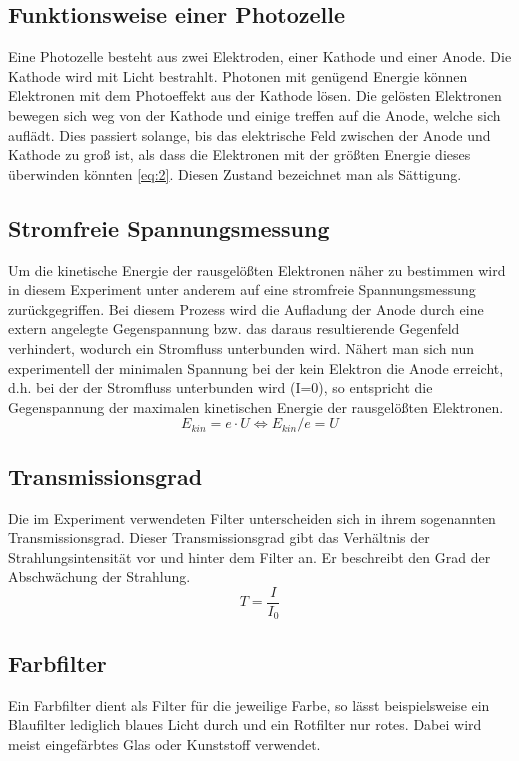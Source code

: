 \documentclass{scrartcl}
\begin{document}
	\subsection{Funktionsweise einer Photozelle}
	Eine Photozelle besteht aus zwei Elektroden, einer Kathode und einer Anode. Die Kathode wird mit Licht bestrahlt.
	 Photonen mit genügend Energie können Elektronen mit dem Photoeffekt aus der Kathode lösen.
	  Die gelösten Elektronen bewegen sich weg von der Kathode und einige treffen auf die Anode, welche sich
	   auflädt. Dies passiert solange, bis das elektrische Feld zwischen der Anode und Kathode zu groß ist,
		als dass die Elektronen mit der größten Energie dieses überwinden könnten \label{eq:2} \ref{eq:2}.
		 Diesen Zustand bezeichnet man als Sättigung.
	\subsection{Stromfreie Spannungsmessung}
		Um die kinetische Energie der rausgelößten Elektronen näher zu bestimmen wird in diesem Experiment unter anderem
		auf eine stromfreie Spannungsmessung zurückgegriffen. Bei diesem Prozess wird die Aufladung der Anode durch eine 
		extern angelegte Gegenspannung bzw. das daraus resultierende Gegenfeld verhindert, wodurch ein Stromfluss unterbunden wird.
		Nähert man sich nun experimentell der minimalen Spannung bei der kein Elektron die Anode erreicht, d.h. bei der 
		der Stromfluss unterbunden wird (I=0), so entspricht die Gegenspannung der maximalen kinetischen Energie der 
		rausgelößten Elektronen.
		\begin{equation}
			E_{kin} = e \cdot U \Leftrightarrow E_{kin}/e = U
		\end{equation}
	\subsection{Transmissionsgrad}
		Die im Experiment verwendeten Filter unterscheiden sich in ihrem sogenannten Transmissionsgrad. Dieser Transmissionsgrad
		gibt das Verhältnis der Strahlungsintensität vor und hinter dem Filter an. Er beschreibt den Grad der Abschwächung der Strahlung.
		\begin{equation}
			T = \frac{I}{I_0}
		\end{equation}
	\subsection{Farbfilter}
		Ein Farbfilter dient als Filter für die jeweilige Farbe, so lässt beispielsweise ein Blaufilter lediglich 
		blaues Licht durch und ein Rotfilter nur rotes. Dabei wird meist eingefärbtes Glas oder Kunststoff verwendet.
\end{document}
